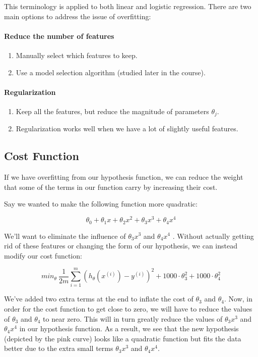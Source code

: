 \documentclass[UTF8]{article}
\begin{document}
This terminology is applied to both linear and logistic regression. There are two main options to address the issue of overfitting:

\paragraph{Reduce the number of features}
\begin{enumerate}[(1)] 
\item Manually select which features to keep. 
\item Use a model selection algorithm (studied later in the course). 
\end{enumerate}

\paragraph{Regularization}
\begin{enumerate}[(1)] 
\item Keep all the features, but reduce the magnitude of parameters $\theta_j$.
\item Regularization works well when we have a lot of slightly useful features.
\end{enumerate}

\subsection{Cost Function}

If we have overfitting from our hypothesis function, we can reduce the weight that some of the terms in our function carry by increasing their cost.

Say we wanted to make the following function more quadratic:

\[\theta_0 + \theta_1x + \theta_2x^2 + \theta_3x^3 + \theta_4x^4\]

We'll want to eliminate the influence of $\theta_3x^3$ and $\theta_4x^4$ . Without actually getting rid of these features or changing the form of our hypothesis, we can instead modify our cost function:

\[min_\theta\ \dfrac{1}{2m}\sum_{i=1}^m (h_\theta(x^{(i)}) - y^{(i)})^2 + 1000\cdot\theta_3^2 + 1000\cdot\theta_4^2\]

We've added two extra terms at the end to inflate the cost of $\theta_3$ and $\theta_4$. Now, in order for the cost function to get close to zero, we will have to reduce the values of $\theta_3$ and $\theta_4$ to near zero. This will in turn greatly reduce the values of $\theta_3x^3$ and $\theta_4x^4$ in our hypothesis function. As a result, we see that the new hypothesis (depicted by the pink curve) looks like a quadratic function but fits the data better due to the extra small terms $\theta_3x^3$ and $\theta_4x^4$.
\end{document}
